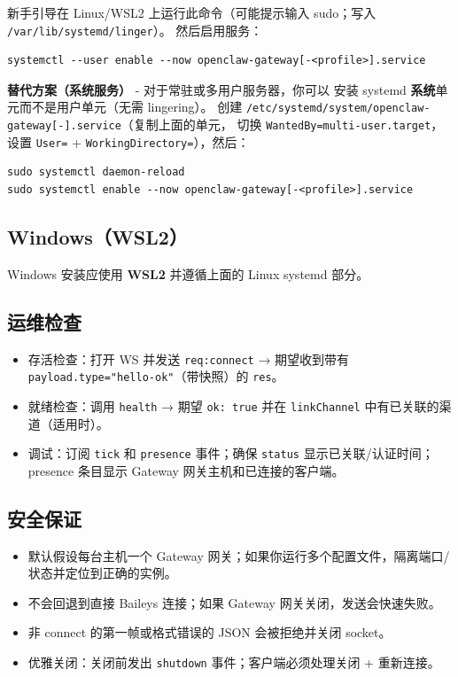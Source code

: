 新手引导在 Linux/WSL2 上运行此命令（可能提示输入 sudo；写入 \texttt{/var/lib/systemd/linger}）。
然后启用服务：

\begin{lstlisting}
systemctl --user enable --now openclaw-gateway[-<profile>].service
\end{lstlisting}


\textbf{替代方案（系统服务）} - 对于常驻或多用户服务器，你可以
安装 systemd \textbf{系统}单元而不是用户单元（无需 lingering）。
创建 \texttt{/etc/systemd/system/openclaw-gateway[-].service}（复制上面的单元，
切换 \texttt{WantedBy=multi-user.target}，设置 \texttt{User=} + \texttt{WorkingDirectory=}），然后：

\begin{lstlisting}
sudo systemctl daemon-reload
sudo systemctl enable --now openclaw-gateway[-<profile>].service
\end{lstlisting}


\subsection{Windows（WSL2）}


Windows 安装应使用 \textbf{WSL2} 并遵循上面的 Linux systemd 部分。

\subsection{运维检查}


\begin{itemize}
  \item 存活检查：打开 WS 并发送 \texttt{req:connect} → 期望收到带有 \texttt{payload.type="hello-ok"}（带快照）的 \texttt{res}。
  \item 就绪检查：调用 \texttt{health} → 期望 \texttt{ok: true} 并在 \texttt{linkChannel} 中有已关联的渠道（适用时）。
  \item 调试：订阅 \texttt{tick} 和 \texttt{presence} 事件；确保 \texttt{status} 显示已关联/认证时间；presence 条目显示 Gateway 网关主机和已连接的客户端。
\end{itemize}


\subsection{安全保证}


\begin{itemize}
  \item 默认假设每台主机一个 Gateway 网关；如果你运行多个配置文件，隔离端口/状态并定位到正确的实例。
  \item 不会回退到直接 Baileys 连接；如果 Gateway 网关关闭，发送会快速失败。
  \item 非 connect 的第一帧或格式错误的 JSON 会被拒绝并关闭 socket。
  \item 优雅关闭：关闭前发出 \texttt{shutdown} 事件；客户端必须处理关闭 + 重新连接。
\end{itemize}


